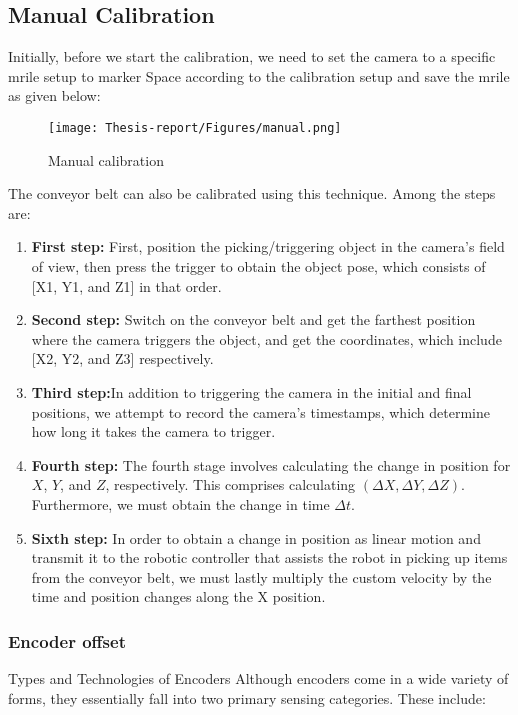 \documentclass[12pt]{article}
\begin{document}
\subsection{Manual Calibration}
Initially, before we start the calibration, we need to set the camera to a specific mrile setup to marker Space according to the calibration setup and save the mrile as given below: \cite{ref2}

\begin{figure}[h]
    \centering
    \texttt{[image: Thesis-report/Figures/manual.png]} 
    \caption{Manual calibration \cite{ref2} }
    \label{fig1.Photoneo Cmaera}
\end{figure}


The conveyor belt can also be calibrated using this technique.  Among the steps are:
\begin{enumerate}
    \item \textbf{First step:}  First, position the picking/triggering object in the camera's field of view, then press the trigger to obtain the object pose, which consists of [X1, Y1, and Z1] in that order\cite{ref2}.
    \item \textbf{Second step:} Switch on the conveyor belt and get the farthest position where the camera triggers the object, and get the coordinates, which include [X2, Y2, and Z3] respectively\cite{ref2}.
    \item \textbf{Third step:}In addition to triggering the camera in the initial and final positions, we attempt to record the camera's timestamps, which determine how long it takes the camera to trigger\cite{ref2}.
    \item \textbf{Fourth step:} The fourth stage involves calculating the change in position for \(X\), \(Y\), and \(Z\), respectively. This comprises calculating \((\Delta X, \Delta Y, \Delta Z)\). Furthermore, we must obtain the change in time \(\Delta t\)\cite{ref2}.
    \item \textbf{Sixth step:} In order to obtain a change in position as linear motion and transmit it to the robotic controller that assists the robot in picking up items from the conveyor belt, we must lastly multiply the custom velocity by the time and position changes along the X position\cite{ref2}.
\end{enumerate}



\subsubsection{Encoder offset}
Types and Technologies of Encoders
Although encoders come in a wide variety of forms, they essentially fall into two primary sensing categories. These include:
\end{document}
